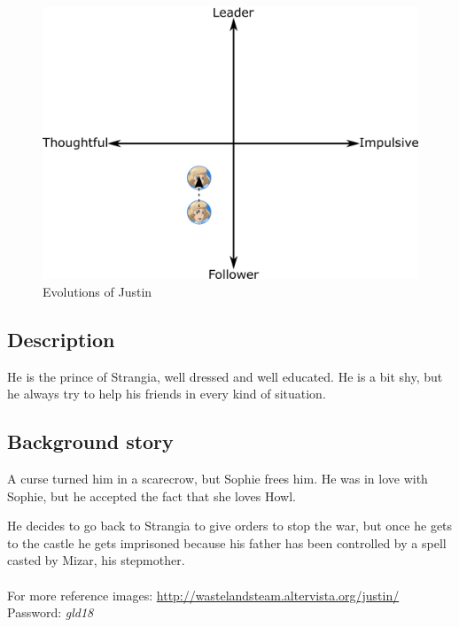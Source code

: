 \begin{figure}[H]
  \centering
   \includegraphics[width=14cm]{Images/Diagrams/Evolutions/justinEvolution}
  \caption{Evolutions of Justin}
\end{figure}

\subsection{Description}
He is the prince of Strangia, well dressed and well educated. He is a bit shy, but he always try to help his friends in every kind of situation.

\subsection{Background story}
A curse turned him in a scarecrow, but Sophie frees him. He was in love with Sophie, but he accepted the fact that she loves Howl.

He decides to go back to Strangia to give orders to stop the war, but once he gets to the castle he gets imprisoned because his father has been controlled by a spell casted by Mizar, his stepmother.\\\\
For more reference images: \href{http://wastelandsteam.altervista.org/justin/}{http://wastelandsteam.altervista.org/justin/}\\
Password: \textit{gld18}
